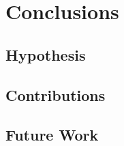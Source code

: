 \section{Conclusions}

\subsection{Hypothesis}
\frameready{}{
  
}
\subsection{Contributions}
\frameready{}{
  
  
  
}


\subsection{Future Work}
\frameready{}{
  
}
